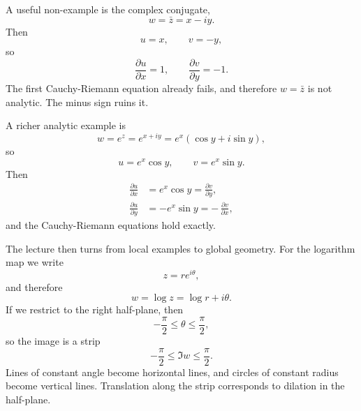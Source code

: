 A useful non-example is the complex conjugate,
\begin{equation}
w=\bar z=x-iy.
\end{equation}
Then
\begin{equation}
u=x, \qquad v=-y,
\end{equation}
so
\begin{equation}
\frac{\partial u}{\partial x}=1, \qquad \frac{\partial v}{\partial y}=-1.
\end{equation}
The first Cauchy-Riemann equation already fails, and therefore \(w=\bar z\) is not analytic. The minus sign ruins it.

A richer analytic example is
\begin{equation}
w=e^z=e^{x+iy}=e^x(\cos y+i\sin y),
\end{equation}
so
\begin{equation}
u=e^x\cos y, \qquad v=e^x\sin y.
\end{equation}
Then
\begin{align}
\frac{\partial u}{\partial x} &= e^x\cos y = \frac{\partial v}{\partial y}, \\
\frac{\partial u}{\partial y} &= -e^x\sin y = -\,\frac{\partial v}{\partial x},
\end{align}
and the Cauchy-Riemann equations hold exactly.

The lecture then turns from local examples to global geometry. For the logarithm map we write
\begin{equation}
z=re^{i\theta},
\end{equation}
and therefore
\begin{equation}
w=\log z=\log r+i\theta.
\end{equation}
If we restrict to the right half-plane, then
\begin{equation}
-\frac{\pi}{2}\leq \theta \leq \frac{\pi}{2},
\end{equation}
so the image is a strip
\begin{equation}
-\frac{\pi}{2}\leq \Im w \leq \frac{\pi}{2}.
\end{equation}
Lines of constant angle become horizontal lines, and circles of constant radius become vertical lines. Translation along the strip corresponds to dilation in the half-plane.

